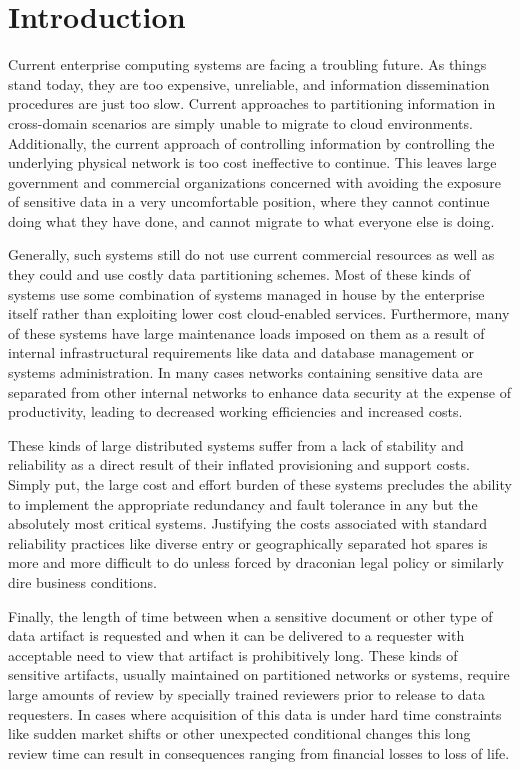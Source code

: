 \section{Introduction}
Current enterprise computing systems are facing a troubling future.  As things stand today, they are too expensive, unreliable, and information dissemination procedures are just too slow.  Current approaches to partitioning information in cross-domain scenarios are simply unable to migrate to cloud environments.  Additionally, the current approach of controlling information by controlling the underlying physical network is too cost ineffective to continue.  This leaves large government and commercial organizations concerned with avoiding the exposure of sensitive data in a very uncomfortable position, where they cannot continue doing what they have done, and cannot migrate to what everyone else is doing.

Generally, such systems still do not use current commercial resources as well as they could and use costly data partitioning schemes.  Most of these kinds of systems use some combination of systems managed in house by the enterprise itself rather than exploiting lower cost cloud-enabled services.  Furthermore, many of these systems have large maintenance loads imposed on them as a result of internal infrastructural requirements like data and database management or systems administration.  In many cases networks containing sensitive data are separated from other internal networks to enhance data security at the expense of productivity, leading to decreased working efficiencies and increased costs.

These kinds of large distributed systems suffer from a lack of stability and reliability as a direct result of their inflated provisioning and support costs.  Simply put, the large cost and effort burden of these systems precludes the ability to implement the appropriate redundancy and fault tolerance in any but the absolutely most critical systems.  Justifying the costs associated with standard reliability practices like diverse entry or geographically separated hot spares is more and more difficult to do unless forced by draconian legal policy or similarly dire business conditions.

Finally, the length of time between when a sensitive document or other type of data artifact is requested and when it can be delivered to a requester with acceptable need to view that artifact is prohibitively long.  These kinds of sensitive artifacts, usually maintained on partitioned networks or systems, require large amounts of review by specially trained reviewers prior to release to data requesters.  In cases where acquisition of this data is under hard time constraints like sudden market shifts or other unexpected conditional changes this long review time can result in consequences ranging from financial losses to loss of life.

